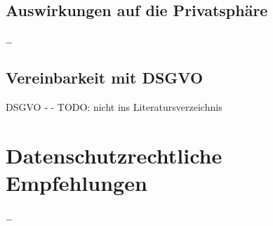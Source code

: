 \subsection{Auswirkungen auf die Privatsphäre}
\label{sec:SecondContentSection:FirstSubsection}

\dots

\subsection{Vereinbarkeit mit DSGVO}
\label{sec:SecondContentSection:SecondSubsection}



DSGVO - \cite{EUdataregulations2018} - TODO: nicht ins Literatursverzeichnis

\section{Datenschutzrechtliche Empfehlungen}
\label{ch:ThirdContentSection}

\dots

